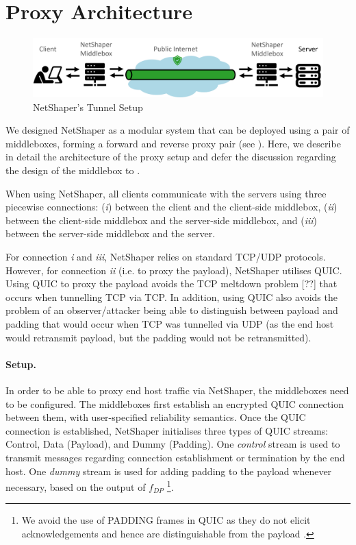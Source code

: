 \section{Proxy Architecture}
\label{sec:proxy-arch}

\begin{figure}[!htb]
    \centering
    \includegraphics[width=\columnwidth]{figures/netshaper/netshaper-setup.png}
    \caption{NetShaper's Tunnel Setup}
    \label{fig:netshaper-setup}
\end{figure}

We designed NetShaper as a modular system that can be deployed using a pair of middleboxes, forming a forward and reverse proxy pair (see ). 
Here, we describe in detail the architecture of the proxy setup and defer the discussion regarding the design of the middlebox to . 

When using NetShaper, all clients communicate with the servers using three piecewise connections: 
(\textit{i}) between the client and the client-side middlebox, 
(\textit{ii}) between the client-side middlebox and the server-side middlebox, and
(\textit{iii}) between the server-side middlebox and the server.

For connection \textit{i} and \textit{iii}, NetShaper relies on standard TCP/UDP protocols. However, for connection \textit{ii} (i.e. to proxy the payload), NetShaper utilises QUIC. 
Using QUIC to proxy the payload avoids the TCP meltdown problem [??] that occurs when tunnelling TCP via TCP.
In addition, using QUIC also avoids the problem of an observer/attacker being able to distinguish between payload and padding that would occur when TCP was tunnelled via UDP (as the end host would retransmit payload, but the padding would not be retransmitted).

\paragraph{Setup.}
In order to be able to proxy end host traffic via NetShaper, the middleboxes need to be configured. 
The middleboxes first establish an encrypted QUIC connection between them, with user-specified reliability semantics.
Once the QUIC connection is established, NetShaper initialises three types of QUIC streams: Control, Data (Payload), and Dummy (Padding).
One \textit{control} stream is used to transmit messages regarding connection establishment or termination by the end host.
One \textit{dummy} stream is used for adding padding to the payload whenever necessary, based on the output of $f_{DP}$
\footnote{We avoid the use of PADDING frames in QUIC as they do not elicit acknowledgements and hence are distinguishable from the payload \cite{quic_rfc}.}.

